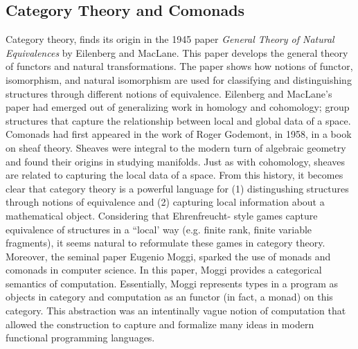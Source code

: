 \subsection{Category Theory and Comonads}
Category theory, finds its origin in the 1945 paper \textit{General Theory of Natural Equivalences} by Eilenberg and MacLane. This paper develops the general theory of functors and natural transformations. The paper shows how notions of functor, isomorphism, and natural isomorphism are used for classifying and distinguishing structures through different notions of equivalence. Eilenberg and MacLane's paper had emerged out of generalizing work in homology and cohomology; group structures that capture the relationship between local and global data of a space. Comonads had first appeared in the work of Roger Godemont, in 1958, in a book on sheaf theory. Sheaves were integral to the modern turn of algebraic geometry and found their origins in studying manifolds. Just as with cohomology, sheaves are related to capturing the local data of a space. From this history, it becomes clear that category theory is a powerful language for (1) distingushing structures through notions of equivalence and (2) capturing local information about a mathematical object. Considering that Ehrenfreucht-{\Fraisse} style games capture equivalence of structures in a ``local' way (e.g. finite rank, finite variable fragments), it seems natural to reformulate these games in category theory. Moreover, the seminal paper \cite{Moggi1991} Eugenio Moggi, sparked the use of monads and comonads in computer science. In this paper, Moggi provides a categorical semantics of computation. Essentially, Moggi represents types in a program as objects in category and computation as an functor (in fact, a monad) on this category. This abstraction was an intentinally vague notion of computation that allowed the construction to capture and formalize many ideas in modern functional programming languages.  
